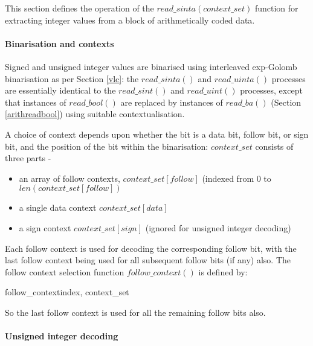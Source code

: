 \label{arithreadint}

This section defines the operation of the $read\_sinta(context\_set)$ function
 for extracting integer values from a block of arithmetically coded data.

\paragraph{Binarisation and contexts \\}

Signed and unsigned integer values are binarised using interleaved exp-Golomb
 binarisation as per Section \ref{vlc}: the $read\_sinta()$ and $read\_uinta()$
processes are essentially identical to the 
$read\_sint()$ and $read\_uint()$ processes, except that instances of $read\_bool()$ are replaced
by instances of $read\_ba()$ (Section \ref{arithreadbool}) using suitable contextualisation. 

A choice of context depends upon whether the bit is a data bit, follow bit, or sign bit, and the 
position of the bit within the binarisation: $context\_set$ consists of three parts -
\begin{itemize}
\item an array of follow contexts, $context\_set[follow]$ (indexed from 0 to 
$len(context\_set[follow])$
\item a single data context $context\_set[data]$ 
\item a sign context $context\_set[sign]$ (ignored for unsigned integer decoding)
\end{itemize}

Each follow context is used for decoding the corresponding follow bit, with the
last follow context being used for all subsequent follow bits (if any) also. 
The follow context selection function $follow\_context()$ is defined by:

\begin{pseudo}{follow\_context}{index, context\_set}
\end{pseudo}

So the last follow context is used for all the remaining follow bits also.

\paragraph{Unsigned integer decoding \\}

